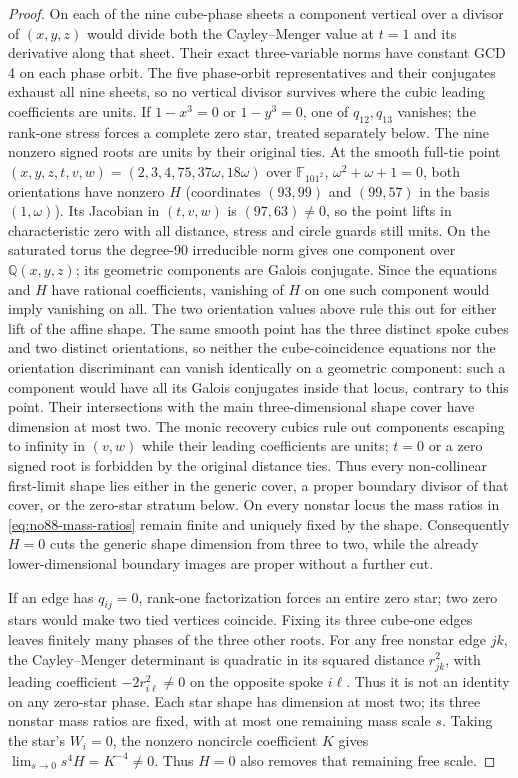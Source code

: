 \documentclass[11pt]{amsart}
\theoremstyle{remark}
\begin{document}
\begin{proof}
On each of the nine cube-phase sheets a component vertical over a divisor of $(x,y,z)$ would divide both the Cayley--Menger value at $t=1$ and its derivative along that sheet. Their exact three-variable norms have constant GCD 4 on each phase orbit. The five phase-orbit representatives and their conjugates exhaust all nine sheets, so no vertical divisor survives where the cubic leading coefficients are units. If $1-x^3=0$ or $1-y^3=0$, one of $q_{12},q_{13}$ vanishes; the rank-one stress forces a complete zero star, treated separately below. The nine nonzero signed roots are units by their original ties. At the smooth full-tie point $(x,y,z,t,v,w)=(2,3,4,75,37\omega,18\omega)$ over $\mathbb F_{101^2}$, $\omega^2+\omega+1=0$, both orientations have nonzero $H$ (coordinates $(93,99)$ and $(99,57)$ in the basis $(1,\omega)$). Its Jacobian in $(t,v,w)$ is $(97,63)\ne0$, so the point lifts in characteristic zero with all distance, stress and circle guards still units. On the saturated torus the degree-90 irreducible norm gives one component over $\mathbb Q(x,y,z)$; its geometric components are Galois conjugate. Since the equations and $H$ have rational coefficients, vanishing of $H$ on one such component would imply vanishing on all. The two orientation values above rule this out for either lift of the affine shape. The same smooth point has the three distinct spoke cubes and two distinct orientations, so neither the cube-coincidence equations nor the orientation discriminant can vanish identically on a geometric component: such a component would have all its Galois conjugates inside that locus, contrary to this point. Their intersections with the main three-dimensional shape cover have dimension at most two. The monic recovery cubics rule out components escaping to infinity in $(v,w)$ while their leading coefficients are units; $t=0$ or a zero signed root is forbidden by the original distance ties. Thus every non-collinear first-limit shape lies either in the generic cover, a proper boundary divisor of that cover, or the zero-star stratum below. On every nonstar locus the mass ratios in \eqref{eq:no88-mass-ratios} remain finite and uniquely fixed by the shape. Consequently $H=0$ cuts the generic shape dimension from three to two, while the already lower-dimensional boundary images are proper without a further cut.

If an edge has $q_{ij}=0$, rank-one factorization forces an entire zero star; two zero stars would make two tied vertices coincide. Fixing its three cube-one edges leaves finitely many phases of the three other roots. For any free nonstar edge $jk$, the Cayley--Menger determinant is quadratic in its squared distance $r_{jk}^2$, with leading coefficient $-2r_{i\ell}^2\ne0$ on the opposite spoke $i\ell$. Thus it is not an identity on any zero-star phase. Each star shape has dimension at most two; its three nonstar mass ratios are fixed, with at most one remaining mass scale $s$. Taking the star's $W_i=0$, the nonzero noncircle coefficient $K$ gives $\lim_{s\to0}s^4H=K^{-4}\ne0$. Thus $H=0$ also removes that remaining free scale.


\end{proof}
\end{document}
